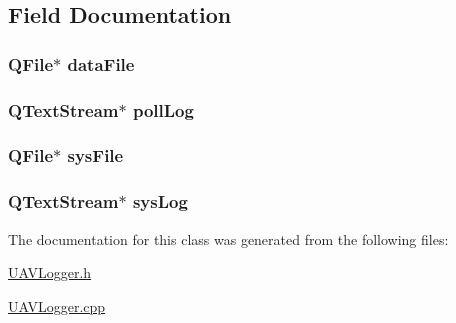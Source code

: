 \subsection{Field Documentation}
\hypertarget{a00014_a0813d5e71c0c333ade9260e2a236b7ed}{
\subsubsection[{data\-File}]{\setlength{\rightskip}{0pt plus 5cm}Q\-File$\ast$ data\-File\hspace{0.3cm}{\ttfamily [private]}}}\label{a00014_a0813d5e71c0c333ade9260e2a236b7ed}
\hypertarget{a00014_a9d49b9bb8b1be68fb2b96cb96c9a39e6}{
\subsubsection[{poll\-Log}]{\setlength{\rightskip}{0pt plus 5cm}Q\-Text\-Stream$\ast$ poll\-Log\hspace{0.3cm}{\ttfamily [private]}}}\label{a00014_a9d49b9bb8b1be68fb2b96cb96c9a39e6}
\hypertarget{a00014_ade1d12dae61eb3386722e7ad2c79518e}{
\subsubsection[{sys\-File}]{\setlength{\rightskip}{0pt plus 5cm}Q\-File$\ast$ sys\-File\hspace{0.3cm}{\ttfamily [private]}}}\label{a00014_ade1d12dae61eb3386722e7ad2c79518e}
\hypertarget{a00014_af915a8ab61a55c6cc5564aa9f79cea25}{
\subsubsection[{sys\-Log}]{\setlength{\rightskip}{0pt plus 5cm}Q\-Text\-Stream$\ast$ sys\-Log\hspace{0.3cm}{\ttfamily [private]}}}\label{a00014_af915a8ab61a55c6cc5564aa9f79cea25}


The documentation for this class was generated from the following files\-:\begin{DoxyCompactItemize}
\item 
\hyperlink{a00041}{U\-A\-V\-Logger.\-h}\item 
\hyperlink{a00040}{U\-A\-V\-Logger.\-cpp}\end{DoxyCompactItemize}

